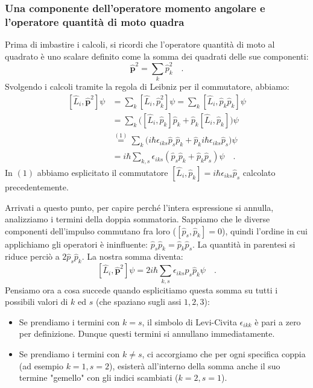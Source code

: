 \subsubsection{Una componente dell'operatore momento angolare e l'operatore quantità di moto quadra}
Prima di imbastire i calcoli, si ricordi che l'operatore quantità di moto al quadrato è uno scalare definito come la somma dei quadrati delle sue componenti:
\[
    \hat{\bm{p}}^2 = \sum_k \hat{p}_k^2 \quad.
\]
Svolgendo i calcoli tramite la regola di Leibniz per il commutatore, abbiamo:
\[
\begin{aligned}
    [\hat{L}_i, \hat{\bm{p}}^2]\psi &= \sum_k [\hat{L}_i , \hat{p}_k^2]\psi = \sum_k [\hat{L}_i , \hat{p}_k \hat{p}_k]\psi \\
    &= \sum_k \biggl([\hat{L}_i , \hat{p}_k] \hat{p}_k + \hat{p}_k [\hat{L}_i , \hat{p}_k] \biggr)\psi \\
    &\overset{(1)}{=} \sum_{k} \bigl( i\hbar \epsilon_{iks}\hat{p}_s\hat{p}_k + \hat{p}_k i\hbar \epsilon_{iks}\hat{p}_s \bigr)\psi \\
    &= i\hbar \sum_{k,s} \epsilon_{iks} (\hat{p}_s\hat{p}_k + \hat{p}_k\hat{p}_s)\psi \quad.
\end{aligned}
\]
In $(1)$ abbiamo esplicitato il commutatore $[\hat{L}_i, \hat{p}_k] = i\hbar \epsilon_{iks}\hat{p}_s$ calcolato precedentemente.

Arrivati a questo punto, per capire perché l'intera espressione si annulla, analizziamo i termini della doppia sommatoria. Sappiamo che le diverse componenti dell'impulso commutano fra loro ($[\hat{p}_s, \hat{p}_k] = 0$), quindi l'ordine in cui applichiamo gli operatori è ininfluente: $\hat{p}_s\hat{p}_k = \hat{p}_k\hat{p}_s$. La quantità in parentesi si riduce perciò a $2\hat{p}_s\hat{p}_k$. La nostra somma diventa:
\[
    [\hat{L}_i, \hat{\bm{p}}^2]\psi = 2i\hbar \sum_{k,s} \epsilon_{iks} \hat{p}_s\hat{p}_k \psi \quad.
\]
Pensiamo ora a cosa succede quando esplicitiamo questa somma su tutti i possibili valori di $k$ ed $s$ (che spaziano sugli assi $1, 2, 3$):
\begin{itemize}
    \item Se prendiamo i termini con $k = s$, il simbolo di Levi-Civita $\epsilon_{ikk}$ è pari a zero per definizione. Dunque questi termini si annullano immediatamente.
    \item Se prendiamo i termini con $k \neq s$, ci accorgiamo che per ogni specifica coppia (ad esempio $k=1, s=2$), esisterà all'interno della somma anche il suo termine "gemello" con gli indici scambiati ($k=2, s=1$).
\end{itemize}

